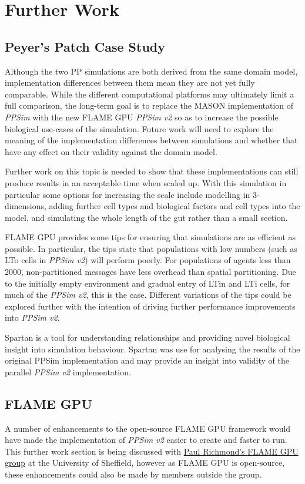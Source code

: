 \documentclass{UoYCSproject}
\begin{document}
\section{Further Work}
\subsection{Peyer's Patch Case Study}
Although the two \gls{PP} simulations are both derived from the same domain model, implementation differences between them mean they are not yet fully comparable.
While the different computational platforms may ultimately limit a full comparison, the long-term goal is to replace the MASON implementation of \textit{PPSim} with the new \gls{FLAME GPU} \textit{PPSim v2} so as to increase the possible biological use-cases of the simulation.
Future work will need to explore the meaning of the implementation differences between simulations and whether that have any effect on their validity against the domain model.

Further work on this topic is needed to show that these implementations can still produce results in an acceptable time when scaled up.
With this simulation in particular some options for increasing the scale include modelling in 3-dimensions, adding further cell types and biological factors and cell types into the model, and simulating the whole length of the gut rather than a small section.

\gls{FLAME GPU} provides some tips for ensuring that simulations are as efficient as possible\cite[p.37]{flame_doc}.
In particular, the tips state that populations with low numbers (such as \gls{LTo} cells in \textit{PPSim v2}) will perform poorly.
For populations of agents less than 2000, non-partitioned messages have less overhead than spatial partitioning.
Due to the initially empty environment and gradual entry of \gls{LTin} and \gls{LTi} cells, for much of the \textit{PPSim v2}, this is the case.
Different variations of the tips could be explored further with the intention of driving further performance improvements into \textit{PPSim v2}.

Spartan is a tool for understanding relationships and providing novel biological insight into simulation behaviour.
Spartan was use for analysing the results of the original PPSim implementation \cite{spartan} and may provide an insight into validity of the parallel \textit{PPSim v2} implementation.

\subsection{\gls{FLAME GPU}}
\label{flame_further_work}
A number of enhancements to the open-source \gls{FLAME GPU} framework would have made the implementation of \textit{PPSim v2} easier to create and faster to run.
This further work section is being discussed with \href{http://paulrichmond.shef.ac.uk/gpu/gpucomputingatsheffield/}{Paul Richmond's \gls{FLAME GPU} group} at the University of Sheffield, however as \gls{FLAME GPU} is open-source, these enhancements could also be made by members outside the group.
\end{document}
